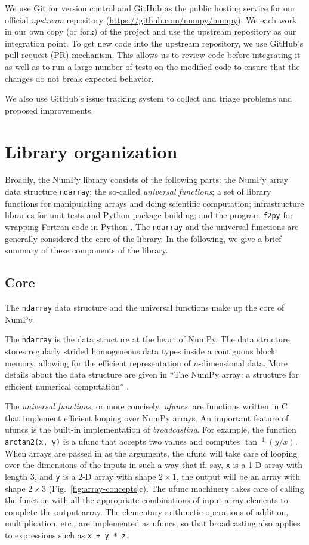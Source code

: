 We use Git for version control and GitHub as the public hosting service for our
official \emph{upstream} repository (\url{https://github.com/numpy/numpy}).
We each work in our own copy (or fork) of the project and use the
upstream repository as our integration point.
To get new code into the upstream repository, we use GitHub's
pull request (PR) mechanism.
This allows us to review code before integrating it as well as to run a
large number of tests on the modified code to ensure that the changes
do not break expected behavior.

We also use GitHub's issue tracking system to collect and triage problems and
proposed improvements.


\section*{Library organization}

Broadly, the NumPy library consists of the following parts:
the NumPy array data structure \texttt{ndarray}; the so-called \emph{universal functions};
a set of library functions for manipulating arrays and doing scientific
computation; infrastructure libraries for unit tests and Python package
building; and the program \texttt{f2py} for wrapping Fortran code in Python \cite{peterson2009f2py}.
The \texttt{ndarray} and the universal functions are generally considered
the core of the library.
In the following, we give a brief summary of these components of the
library.

\subsection*{Core}

The \texttt{ndarray} data structure and the
universal functions make up the core of NumPy.

The \texttt{ndarray} is the data structure at the heart of NumPy.
The data structure stores regularly strided homogeneous data types
inside a contiguous block memory, allowing for the efficient representation
of $n$-dimensional data.
More details about the data structure are given in ``The NumPy array:
a structure for efficient numerical computation'' \cite{vanderwalt2011numpy}.

The \emph{universal functions}, or more concisely, \emph{ufuncs},
are functions written in C that implement efficient looping over
NumPy arrays. An important feature of ufuncs is the built-in
implementation of \emph{broadcasting}.  For example, the function
\texttt{arctan2(x, y)} is a ufunc that accepts two values and computes
$\tan^{-1}(y/x)$.  When arrays are passed in as the arguments,
the ufunc will take care of looping over the dimensions of the inputs
in such a way that if, say, \texttt{x} is a 1-D array with length 3, and
\texttt{y} is a 2-D array with shape $2 \times 1$, the output will be
an array with shape $2 \times 3$ (Fig.~\ref{fig:array-concepts}c).
The ufunc machinery takes care
of calling the function with all the appropriate combinations of
input array elements to complete the output array.
The elementary arithmetic operations of addition, multiplication, etc.,
are implemented as ufuncs, so that broadcasting also applies to expressions
such as \texttt{x + y * z}.

